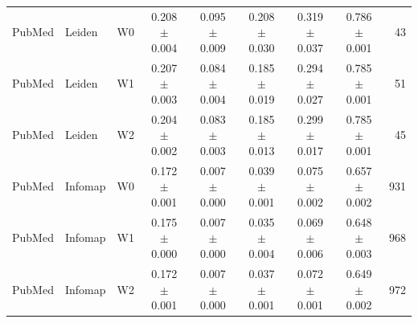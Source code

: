 \begin{table}[!t]
{\begin{tabular}{@{}lllcccccr@{}}
PubMed & Leiden & W0 & 0.208 $\pm$ 0.004 & 0.095 $\pm$ 0.009 & 0.208 $\pm$ 0.030 & 0.319 $\pm$ 0.037 & 0.786 $\pm$ 0.001 & 43 \\
PubMed & Leiden & W1 & 0.207 $\pm$ 0.003 & 0.084 $\pm$ 0.004 & 0.185 $\pm$ 0.019 & 0.294 $\pm$ 0.027 & 0.785 $\pm$ 0.001 & 51 \\
PubMed & Leiden & W2 & 0.204 $\pm$ 0.002 & 0.083 $\pm$ 0.003 & 0.185 $\pm$ 0.013 & 0.299 $\pm$ 0.017 & 0.785 $\pm$ 0.001 & 45 \\
PubMed & Infomap & W0 & 0.172 $\pm$ 0.001 & 0.007 $\pm$ 0.000 & 0.039 $\pm$ 0.001 & 0.075 $\pm$ 0.002 & 0.657 $\pm$ 0.002 & 931 \\
PubMed & Infomap & W1 & 0.175 $\pm$ 0.000 & 0.007 $\pm$ 0.000 & 0.035 $\pm$ 0.004 & 0.069 $\pm$ 0.006 & 0.648 $\pm$ 0.003 & 968 \\
PubMed & Infomap & W2 & 0.172 $\pm$ 0.001 & 0.007 $\pm$ 0.000 & 0.037 $\pm$ 0.001 & 0.072 $\pm$ 0.001 & 0.649 $\pm$ 0.002 & 972 \\
\bottomrule
\end{tabular}}
\end{table}
